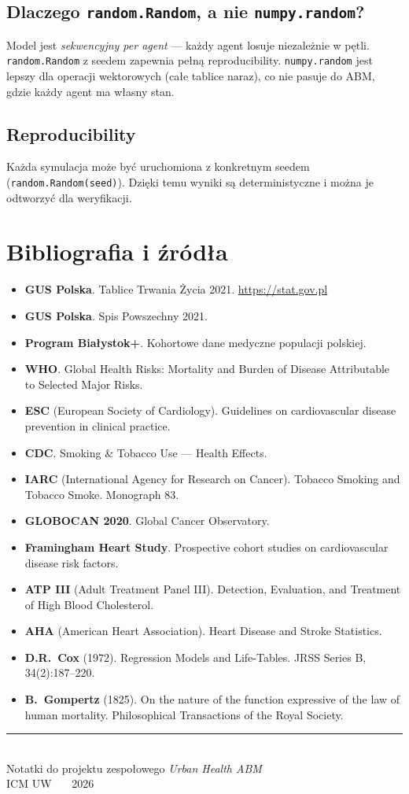 \documentclass[11pt,a4paper]{article}
\begin{document}
\subsection{Dlaczego \texttt{random.Random}, a nie \texttt{numpy.random}?}

Model jest \emph{sekwencyjny per agent} --- każdy agent losuje niezależnie w pętli. \texttt{random.Random} z seedem zapewnia pełną reproducibility. \texttt{numpy.random} jest lepszy dla operacji wektorowych (całe tablice naraz), co nie pasuje do ABM, gdzie każdy agent ma własny stan.

\subsection{Reproducibility}

Każda symulacja może być uruchomiona z konkretnym seedem (\texttt{random.Random(seed)}). Dzięki temu wyniki są deterministyczne i można je odtworzyć dla weryfikacji.

\newpage
\section{Bibliografia i źródła}

\begin{itemize}[leftmargin=*]
  \item \textbf{GUS Polska}. Tablice Trwania Życia 2021. \url{https://stat.gov.pl}
  \item \textbf{GUS Polska}. Spis Powszechny 2021.
  \item \textbf{Program Białystok+}. Kohortowe dane medyczne populacji polskiej.
  \item \textbf{WHO}. Global Health Risks: Mortality and Burden of Disease Attributable to Selected Major Risks.
  \item \textbf{ESC} (European Society of Cardiology). Guidelines on cardiovascular disease prevention in clinical practice.
  \item \textbf{CDC}. Smoking \& Tobacco Use --- Health Effects.
  \item \textbf{IARC} (International Agency for Research on Cancer). Tobacco Smoking and Tobacco Smoke. Monograph 83.
  \item \textbf{GLOBOCAN 2020}. Global Cancer Observatory.
  \item \textbf{Framingham Heart Study}. Prospective cohort studies on cardiovascular disease risk factors.
  \item \textbf{ATP III} (Adult Treatment Panel III). Detection, Evaluation, and Treatment of High Blood Cholesterol.
  \item \textbf{AHA} (American Heart Association). Heart Disease and Stroke Statistics.
  \item \textbf{D.R.\ Cox} (1972). Regression Models and Life-Tables. JRSS Series B, 34(2):187--220.
  \item \textbf{B.\ Gompertz} (1825). On the nature of the function expressive of the law of human mortality. Philosophical Transactions of the Royal Society.
\end{itemize}

\vfill
\begin{center}
\color{muted}\small
\rule{0.4\textwidth}{0.4pt}\\[8pt]
Notatki do projektu zespołowego \emph{Urban Health ABM}\\
ICM UW \ \textbar\ \ 2026
\end{center}
\end{document}
